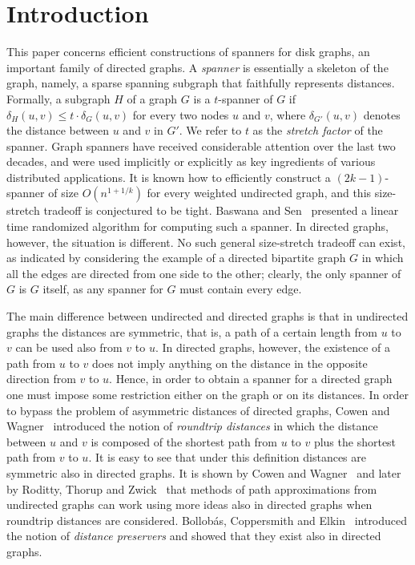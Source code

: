 \documentclass[proceedings]{stacs}
\theoremstyle{plain}\newtheorem{satz}[thm]{Satz}
\theoremstyle{definition}\newtheorem{crucial}[thm]{Crucial Definition}
\begin{document}
\section*{Introduction}\label{S:one}

This paper concerns efficient constructions of spanners for disk
graphs, an important family of directed graphs. A {\em spanner} is
essentially a skeleton of the graph, namely, a sparse spanning
subgraph that faithfully represents distances. Formally, a
subgraph $H$ of a graph $G$ is a $t$-spanner of $G$ if
$\delta_H(u,v) \leq t \cdot\delta_G(u,v)$ for every two nodes $u$
and $v$, where $\delta_{G'}(u,v)$ denotes the distance between $u$
and $v$ in $G'$. We refer to $t$ as the {\em stretch factor} of
the spanner. Graph spanners have received considerable attention
over the last two decades, and were used implicitly or explicitly
as key ingredients of various distributed applications. It is
known how to efficiently construct a $(2k-1)$-spanner of size
$O(n^{1+1/k})$ for every weighted undirected graph, and this
size-stretch tradeoff is conjectured to be tight. Baswana and
Sen~\cite{BaSe07} presented a linear time randomized algorithm for
computing such a spanner. In directed graphs, however, the
situation is different. No such general size-stretch tradeoff can
exist, as indicated by considering the example of a directed
bipartite graph $G$ in which all the edges are directed from one
side to the other; clearly, the only spanner of $G$ is $G$ itself,
as any spanner for $G$ must contain every edge.

The main difference between undirected and directed graphs is that
in undirected graphs the distances are symmetric, that is, a path
of a certain length from $u$ to $v$ can be used also from $v$ to
$u$. In directed graphs, however, the existence of a path from $u$
to $v$ does not imply anything on the distance in the opposite
direction from $v$ to $u$. Hence, in order to obtain a spanner for
a directed graph one must impose some restriction either on the
graph or on its distances. In order to bypass the problem of
asymmetric distances of directed graphs, Cowen and
Wagner~\cite{CoWa99} introduced the notion of {\em roundtrip
distances} in which the distance between $u$ and $v$ is composed
of the shortest path from $u$ to $v$ plus the shortest path from
$v$ to $u$. It is easy to see that under this definition distances
are symmetric also in directed graphs. It is shown by Cowen and
Wagner~\cite{CoWa99} and later by Roditty, Thorup and
Zwick~\cite{RoThZw08} that methods of path approximations from
undirected graphs can work using more ideas also in directed
graphs when roundtrip distances are considered. Bollob{\'a}s,
Coppersmith and Elkin~\cite{BoCoEl05} introduced the notion of
{\em distance preservers} and showed that they exist also in
directed graphs.
\end{document}
